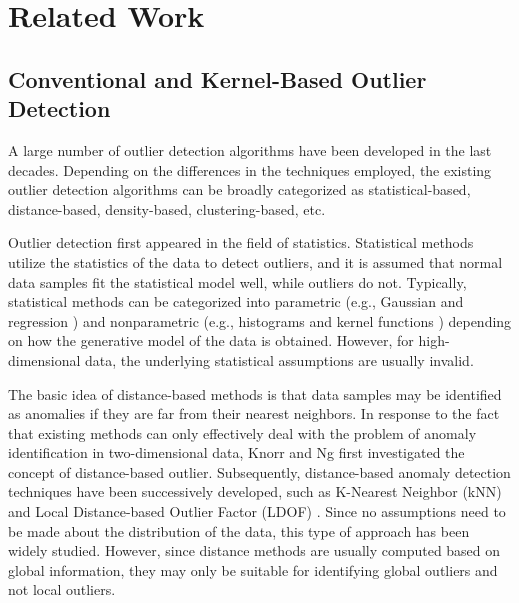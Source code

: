 \documentclass[ASNA,twocolumn]{USG} %
\begin{document}
 
\section{Related Work}\label{Related work}

\subsection{Conventional and Kernel-Based Outlier Detection}

A large number of outlier detection algorithms have been developed in the last decades. Depending on the differences in the techniques employed, the existing outlier detection algorithms can be broadly categorized as statistical-based, distance-based, density-based, clustering-based, etc. 

Outlier detection first appeared in the field of statistics. Statistical methods utilize the statistics of the data to detect outliers, and it is assumed that normal data samples fit the statistical model well, while outliers do not. Typically, statistical methods can be categorized into parametric (e.g., Gaussian \cite{rippel2021gaussian} and regression \cite{mok2010random}) and nonparametric (e.g., histograms \cite{goldstein2012histogram} and kernel functions \cite{latecki2007outlier}) depending on how the generative model of the data is obtained. However, for high-dimensional data, the underlying statistical assumptions are usually invalid.

The basic idea of distance-based methods is that data samples may be identified as anomalies if they are far from their nearest neighbors. In response to the fact that existing methods can only effectively deal with the problem of anomaly identification in two-dimensional data, Knorr and Ng \cite{knorr1998algorithms} first investigated the concept of distance-based outlier.
Subsequently, distance-based anomaly detection techniques have been successively developed, such as K-Nearest Neighbor (kNN) \cite{ramaswamy2000efficient} and Local Distance-based Outlier Factor (LDOF) \cite{zhang2009new}.
Since no assumptions need to be made about the distribution of the data, this type of approach has been widely studied. However, since distance methods are usually computed based on global information, they may only be suitable for identifying global outliers and not local outliers.
\end{document}
